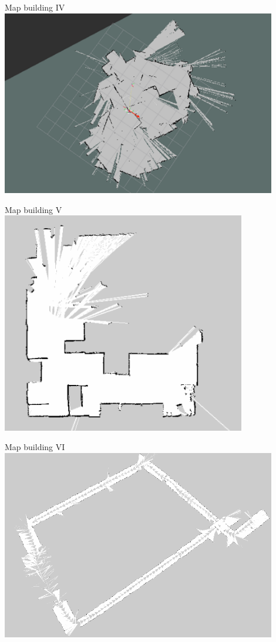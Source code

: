 \begin{frame}{Map building IV}
    \centering
    \includegraphics[width=0.9\textwidth]{gfx/map_messy.png}
\end{frame}
\begin{frame}{Map building V}
\centering
\includegraphics[width=0.8\textwidth]{gfx/map.png}
\end{frame}
\begin{frame}{Map building VI}
\centering
\includegraphics[width=0.9\textwidth]{gfx/floor.png}
\end{frame}
